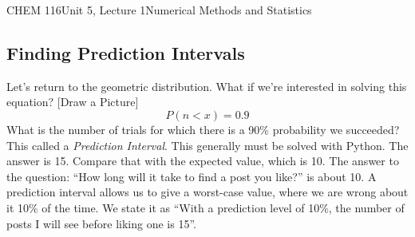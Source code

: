 \documentclass{article}
\begin{document}
\begin{tdoc}{CHEM 116}{Unit 5, Lecture 1}{Numerical Methods and Statistics}
\subsection{Finding Prediction Intervals}

Let's return to the geometric distribution. What if we're interested
in solving this equation? [Draw a Picture]
\[
P(n < x) = 0.9
\]
What is the number of trials for which there is a 90\% probability we
succeeded? This called a \emph{Prediction Interval}. This generally
must be solved with Python. The answer is 15. Compare that with the
expected value, which is 10. The answer to the question: ``How long
will it take to find a post you like?'' is about 10. A prediction
interval allows us to give a worst-case value, where we are wrong
about it 10\% of the time. We state it as ``With a prediction level of
10\%, the number of posts I will see before liking one is 15''.


\end{tdoc}
\end{document}
